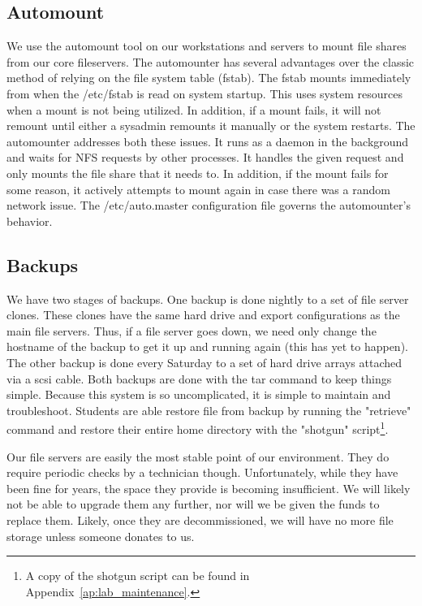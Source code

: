 \subsection{Automount}
We use the automount tool on our workstations and servers to mount file shares from our core fileservers.  The automounter has several advantages over the classic method of relying on the file system table (fstab).  The fstab mounts immediately from when the /etc/fstab is read on system startup.  This uses system resources when a mount is not being utilized.  In addition, if a mount fails, it will not remount until either a sysadmin remounts it manually or the system restarts.  The automounter addresses both these issues.  It runs as a daemon in the background and waits for NFS requests by other processes.  It handles the given request and only mounts the file share that it needs to.  In addition, if the mount fails for some reason, it actively attempts to mount again in case there was a random network issue.  The /etc/auto.master configuration file governs the automounter's behavior.

\subsection{Backups}
We have two stages of backups.  One backup is done nightly to a set of file server clones.  These clones have the same hard drive and export configurations as the main file servers.  Thus, if a file server goes down, we need only change the hostname of the backup to get it up and running again (this has yet to happen).  The other backup is done every Saturday to a set of hard drive arrays attached via a scsi cable.  Both backups are done with the tar command to keep things simple.  Because this system is so uncomplicated, it is simple to maintain and troubleshoot.  Students are able restore file from backup by running the "retrieve" command and restore their entire home directory with the "shotgun" script\footnote{A copy of the shotgun script can be found in Appendix~\ref{ap:lab_maintenance}.}.

Our file servers are easily the most stable point of our environment.  They do require periodic checks by a technician though.  Unfortunately, while they have been fine for years, the space they provide is becoming insufficient.  We will likely not be able to upgrade them any further, nor will we be given the funds to replace them.  Likely, once they are decommissioned, we will have no more file storage unless someone donates to us.  

